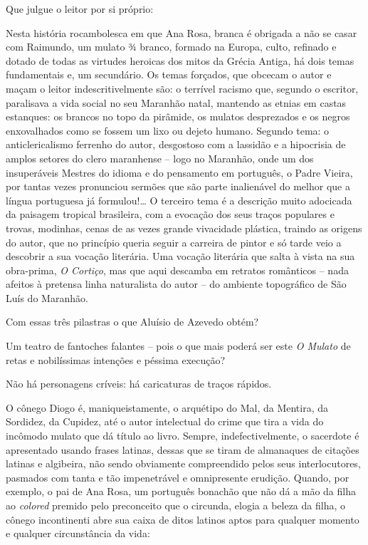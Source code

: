 \documentclass[
  letterpaper,
  DIV=11,
  numbers=noendperiod]{scrreprt}
\begin{document}
Que julgue o leitor por si próprio:

Nesta história rocambolesca em que Ana Rosa, branca é obrigada a não se
casar com Raimundo, um mulato ¾ branco, formado na Europa, culto,
refinado e dotado de todas as virtudes heroicas dos mitos da Grécia
Antiga, há dois temas fundamentais e, um secundário. Os temas forçados,
que obcecam o autor e maçam o leitor indescritivelmente são: o terrível
racismo que, segundo o escritor, paralisava a vida social no seu
Maranhão natal, mantendo as etnias em castas estanques: os brancos no
topo da pirâmide, os mulatos desprezados e os negros enxovalhados como
se fossem um lixo ou dejeto humano. Segundo tema: o anticlericalismo
ferrenho do autor, desgostoso com a lassidão e a hipocrisia de amplos
setores do clero maranhense -- logo no Maranhão, onde um dos
insuperáveis Mestres do idioma e do pensamento em português, o Padre
Vieira, por tantas vezes pronunciou sermões que são parte inalienável do
melhor que a língua portuguesa já formulou!\ldots{} O terceiro tema é a
descrição muito adocicada da paisagem tropical brasileira, com a
evocação dos seus traços populares e trovas, modinhas, cenas de as vezes
grande vivacidade plástica, traindo as origens do autor, que no
princípio queria seguir a carreira de pintor e só tarde veio a descobrir
a sua vocação literária. Uma vocação literária que salta à vista na sua
obra-prima, \emph{O Cortiço}, mas que aqui descamba em retratos
românticos -- nada afeitos à pretensa linha naturalista do autor -- do
ambiente topográfico de São Luís do Maranhão.

Com essas três pilastras o que Aluísio de Azevedo obtém?

Um teatro de fantoches falantes -- pois o que mais poderá ser este
\emph{O Mulato} de retas e nobilíssimas intenções e péssima execução?

Não há personagens críveis: há caricaturas de traços rápidos.

O cônego Diogo é, maniqueistamente, o arquétipo do Mal, da Mentira, da
Sordidez, da Cupidez, até o autor intelectual do crime que tira a vida
do incômodo mulato que dá título ao livro. Sempre, indefectivelmente, o
sacerdote é apresentado usando frases latinas, dessas que se tiram de
almanaques de citações latinas e algibeira, não sendo obviamente
compreendido pelos seus interlocutores, pasmados com tanta e tão
impenetrável e omnipresente erudição. Quando, por exemplo, o pai de Ana
Rosa, um português bonachão que não dá a mão da filha ao \emph{colored}
premido pelo preconceito que o circunda, elogia a beleza da filha, o
cônego incontinenti abre sua caixa de ditos latinos aptos para qualquer
momento e qualquer circunstância da vida:
\end{document}

